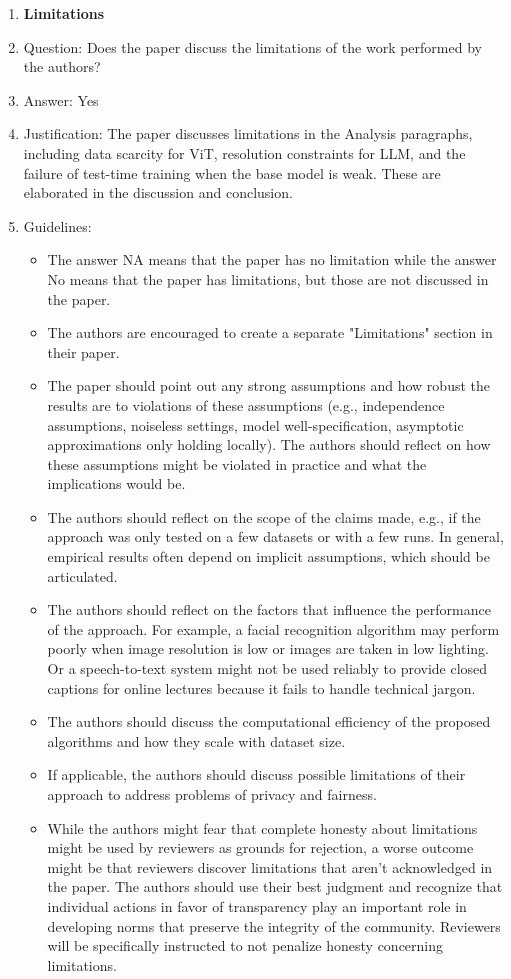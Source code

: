\documentclass{article}
\newcommand{\answerYes}[1][]{Yes}
\begin{document}
\begin{enumerate}
\item {\bf Limitations}
    \item[] Question: Does the paper discuss the limitations of the work performed by the authors?
    \item[] Answer: \answerYes{}
    \item[] Justification: The paper discusses limitations in the Analysis paragraphs, including data scarcity for ViT, resolution constraints for LLM, and the failure of test-time training when the base model is weak. These are elaborated in the discussion and conclusion.
    \item[] Guidelines:
    \begin{itemize}
        \item The answer NA means that the paper has no limitation while the answer No means that the paper has limitations, but those are not discussed in the paper. 
        \item The authors are encouraged to create a separate "Limitations" section in their paper.
        \item The paper should point out any strong assumptions and how robust the results are to violations of these assumptions (e.g., independence assumptions, noiseless settings, model well-specification, asymptotic approximations only holding locally). The authors should reflect on how these assumptions might be violated in practice and what the implications would be.
        \item The authors should reflect on the scope of the claims made, e.g., if the approach was only tested on a few datasets or with a few runs. In general, empirical results often depend on implicit assumptions, which should be articulated.
        \item The authors should reflect on the factors that influence the performance of the approach. For example, a facial recognition algorithm may perform poorly when image resolution is low or images are taken in low lighting. Or a speech-to-text system might not be used reliably to provide closed captions for online lectures because it fails to handle technical jargon.
        \item The authors should discuss the computational efficiency of the proposed algorithms and how they scale with dataset size.
        \item If applicable, the authors should discuss possible limitations of their approach to address problems of privacy and fairness.
        \item While the authors might fear that complete honesty about limitations might be used by reviewers as grounds for rejection, a worse outcome might be that reviewers discover limitations that aren't acknowledged in the paper. The authors should use their best judgment and recognize that individual actions in favor of transparency play an important role in developing norms that preserve the integrity of the community. Reviewers will be specifically instructed to not penalize honesty concerning limitations.
    \end{itemize}


\end{enumerate}
\end{document}
